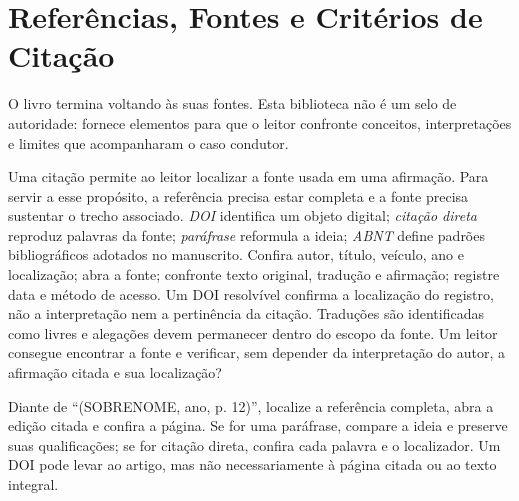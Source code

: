 \thispagestyle{fancy}
\chapter{Referências, Fontes e Critérios de Citação}

O livro termina voltando às suas fontes. Esta biblioteca não é um selo de autoridade: fornece elementos para que o leitor confronte conceitos, interpretações e limites que acompanharam o caso condutor.


\roteirodidatico
{Uma citação permite ao leitor localizar a fonte usada em uma afirmação. Para servir a esse propósito, a referência precisa estar completa e a fonte precisa sustentar o trecho associado.}
{\emph{DOI} identifica um objeto digital; \emph{citação direta} reproduz palavras da fonte; \emph{paráfrase} reformula a ideia; \emph{ABNT} define padrões bibliográficos adotados no manuscrito.}
{Confira autor, título, veículo, ano e localização; abra a fonte; confronte texto original, tradução e afirmação; registre data e método de acesso.}
{Um DOI resolvível confirma a localização do registro, não a interpretação nem a pertinência da citação. Traduções são identificadas como livres e alegações devem permanecer dentro do escopo da fonte.}
{Um leitor consegue encontrar a fonte e verificar, sem depender da interpretação do autor, a afirmação citada e sua localização?}

{Diante de ``(SOBRENOME, ano, p. 12)'', localize a referência completa, abra a edição citada e confira a página. Se for uma paráfrase, compare a ideia e preserve suas qualificações; se for citação direta, confira cada palavra e o localizador. Um DOI pode levar ao artigo, mas não necessariamente à página citada ou ao texto integral.}

